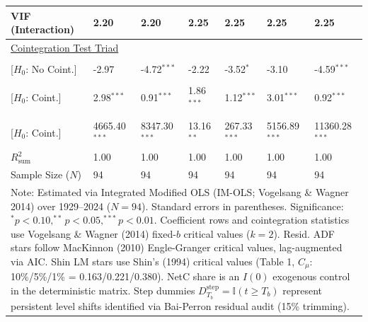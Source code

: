 \begin{table}[H]
\begin{tabular}{p{3.8cm}p{2.1cm}p{2.1cm}p{2.1cm}p{2.1cm}p{2.1cm}p{2.1cm}}
VIF (Interaction) & 2.20 & 2.20 & 2.25 & 2.25 & 2.25 & 2.25  \\
\midrule
\multicolumn{7}{l}{\underline{Cointegration Test Triad}} \\
\makecell[l]{Resid. ADF ($t_{\text{ADF}}$) \\ {\scriptsize [$H_0$: No Coint.]}} & -2.97 & -4.72$^{***}$ & -2.22 & -3.52$^{*}$ & -3.10 & -4.59$^{***}$  \\
\makecell[l]{Shin LM ($C_{\text{Shin}}$) \\ {\scriptsize [$H_0$: Coint.]}} & 2.98$^{***}$ & 0.91$^{***}$ & 1.86$^{***}$ & 1.12$^{***}$ & 3.01$^{***}$ & 0.92$^{***}$  \\
\makecell[l]{VW Type 2 ($S_{\text{Type 2}}$) \\ {\scriptsize [$H_0$: Coint.]}} & 4665.40$^{***}$ & 8347.30$^{***}$ & 13.16$^{**}$ & 267.33$^{***}$ & 5156.89$^{***}$ & 11360.28$^{***}$  \\
\midrule
$R^2_{\text{sum}}$ & 1.00 & 1.00 & 1.00 & 1.00 & 1.00 & 1.00  \\
Sample Size ($N$) & 94 & 94 & 94 & 94 & 94 & 94  \\
\bottomrule
\multicolumn{7}{p{16.5cm}}{\footnotesize Note: Estimated via Integrated Modified OLS (IM-OLS; Vogelsang \& Wagner 2014) over 1929--2024 ($N=94$). Standard errors in parentheses. Significance: $^*p<0.10, ^{**}p<0.05, ^{***}p<0.01$. Coefficient rows and cointegration statistics use Vogelsang \& Wagner (2014) fixed-$b$ critical values ($k=2$). Resid. ADF stars follow MacKinnon (2010) Engle-Granger critical values, lag-augmented via AIC. Shin LM stars use Shin's (1994) critical values (Table 1, $C_\mu$: 10\%/5\%/1\% = 0.163/0.221/0.380). NetC share is an $I(0)$ exogenous control in the deterministic matrix. Step dummies $D^{\text{step}}_{T_b} = \mathbb{I}(t \ge T_b)$ represent persistent level shifts identified via Bai-Perron residual audit (15\% trimming).}
\end{tabular}
\end{table}
